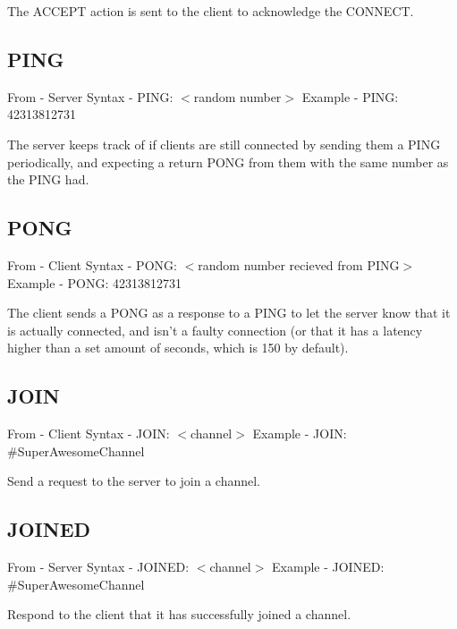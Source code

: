 \documentclass[12pt]{rapport}
\begin{document}
\noindent The ACCEPT action is sent to the client to acknowledge the CONNECT.

\subsection*{PING}
From    - Server\newline
Syntax  - PING: $<$random number$>$\newline
Example - PING: 42313812731\newline

\noindent The server keeps track of if clients are still connected by sending them a PING periodically, and expecting a return PONG from them with the same number as the PING had.

\subsection*{PONG}
From    - Client\newline
Syntax  - PONG: $<$random number recieved from PING$>$\newline
Example - PONG: 42313812731\newline

\noindent The client sends a PONG as a response to a PING to let the server know that it is actually connected, and isn't a faulty connection (or that it has a latency higher than a set amount of seconds, which is 150 by default).

\subsection*{JOIN}
From    - Client\newline
Syntax  - JOIN: $<$channel$>$\newline
Example - JOIN: \#SuperAwesomeChannel\newline

\noindent Send a request to the server to join a channel.

\subsection*{JOINED}
From    - Server\newline
Syntax  - JOINED: $<$channel$>$\newline
Example - JOINED: \#SuperAwesomeChannel\newline

\noindent Respond to the client that it has successfully joined a channel.
\end{document}
